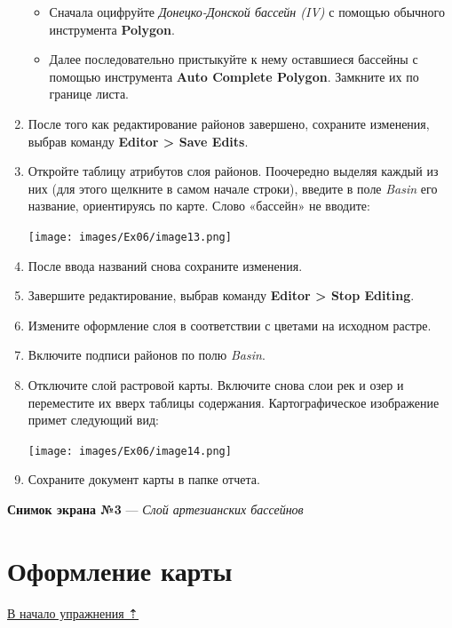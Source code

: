 \documentclass[12pt,]{book}
\begin{document}
\begin{enumerate}
  \begin{itemize}
  \item
    Сначала оцифруйте \emph{Донецко-Донской бассейн (IV)} с помощью обычного инструмента \textbf{Polygon}.
  \item
    Далее последовательно пристыкуйте к нему оставшиеся бассейны с помощью инструмента \textbf{Auto Complete Polygon}. Замкните их по границе листа.
  \end{itemize}
\item
  После того как редактирование районов завершено, сохраните изменения, выбрав команду \textbf{Editor \textgreater{} Save Edits}.
\item
  Откройте таблицу атрибутов слоя районов. Поочередно выделяя каждый из них (для этого щелкните в самом начале строки), введите в поле \emph{Basin} его название, ориентируясь по карте. Слово «бассейн» не вводите:

  \texttt{[image: images/Ex06/image13.png]}
\item
  После ввода названий снова сохраните изменения.
\item
  Завершите редактирование, выбрав команду \textbf{Editor \textgreater{} Stop Editing}.
\item
  Измените оформление слоя в соответствии с цветами на
  исходном растре.
\item
  Включите подписи районов по полю \emph{Basin}.
\item
  Отключите слой растровой карты. Включите снова слои рек и озер и
  переместите их вверх таблицы содержания. Картографическое
  изображение примет следующий вид:

  \texttt{[image: images/Ex06/image14.png]}
\item
  Сохраните документ карты в папке отчета.
\end{enumerate}

\textbf{Снимок экрана №3} --- \emph{Слой артезианских бассейнов}

\hypertarget{map-ref-hydrogeologic-design}{%
\section{Оформление карты}\label{map-ref-hydrogeologic-design}}

\protect\hyperlink{map-ref-hydrogeologic}{В начало упражнения ⇡}
\end{document}
